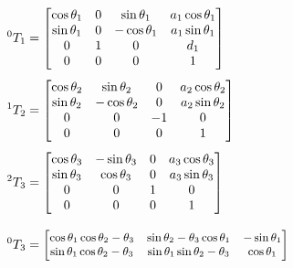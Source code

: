 \begin{align}
    ^0T_1 & =
    \begin{bmatrix}
        \cos{\theta_{1}} & 0 & \sin{\theta_{1}}   & a_{1} \cos{\theta_{1}} \\
        \sin{\theta_{1}} & 0 & - \cos{\theta_{1}} & a_{1} \sin{\theta_{1}} \\
        0                & 1 & 0                  & d_{1}                  \\
        0                & 0 & 0                  & 1                      \\
    \end{bmatrix}\label{eq:t01} \\[1ex]
    ^1T_2 & =
    \begin{bmatrix}
        \cos{\theta_{2}} & \sin{\theta_{2}}   & 0  & a_{2} \cos{\theta_{2}} \\
        \sin{\theta_{2}} & - \cos{\theta_{2}} & 0  & a_{2} \sin{\theta_{2}} \\
        0                & 0                  & -1 & 0                      \\
        0                & 0                  & 0  & 1                      \\
    \end{bmatrix}\label{eq:t12} \\[1ex]
    ^2T_3 & =
    \begin{bmatrix}
        \cos{\theta_{3}} & - \sin{\theta_{3}} & 0 & a_{3} \cos{\theta_{3}} \\
        \sin{\theta_{3}} & \cos{\theta_{3}}   & 0 & a_{3} \sin{\theta_{3}} \\
        0                & 0                  & 1 & 0                      \\
        0                & 0                  & 0 & 1                      \\
    \end{bmatrix}\label{eq:t23} \\[2ex]
    ^0T_3 & =
    {\small\begin{bmatrix}
        \cos{\theta_{1}} \cos{\theta_{2} - \theta_{3}} & \sin{\theta_{2} - \theta_{3}} \cos{\theta_{1}}                                                                    & - \sin{\theta_{1}} \\
        \sin{\theta_{1}} \cos{\theta_{2} - \theta_{3}} & \sin{\theta_{1}} \sin{\theta_{2} - \theta_{3}}                                                                    & \cos{\theta_{1}}   \\

\end{bmatrix}}
\end{align}
